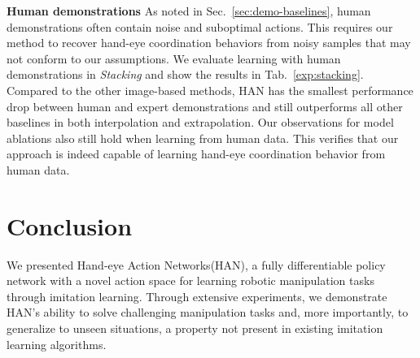\documentclass[letterpaper, 10 pt, conference]{ieeeconf}
\newcommand{\algoName}{HAN\xspace}
\newcommand{\algoNameFull}{Hand-eye Action Networks\xspace}
\begin{document}
\begin{table}[]
\centering
\caption{\textbf{Quantitative Evaluation in the \textit{Tool Using} environment}}
\label{exp:tool}
\vspace{-0pt}
\end{table}

\textbf{Human demonstrations} As noted in Sec.~\ref{sec:demo-baselines}, human demonstrations often contain noise and suboptimal actions. This requires our method to recover hand-eye coordination behaviors from noisy samples that may not conform to our assumptions. We evaluate learning with human demonstrations in \emph{Stacking} and show the results in Tab.~\ref{exp:stacking}. Compared to the other image-based methods, \algoName has the smallest performance drop between human and expert demonstrations and still outperforms all other baselines in both interpolation and extrapolation. Our observations for model ablations also still hold when learning from human data. This verifies that our approach is indeed capable of learning hand-eye coordination behavior from human data.

\section{Conclusion}
We presented \algoNameFull (\algoName), a fully differentiable policy network with a novel action space for learning robotic manipulation tasks through imitation learning. Through extensive experiments, we demonstrate \algoName's ability to solve challenging manipulation tasks and, more importantly, to generalize to unseen situations, a property not present in existing imitation learning algorithms. 
\end{document}
